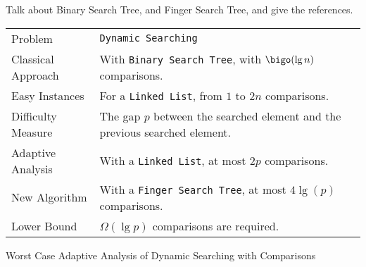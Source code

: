 \begin{TODO}
Talk about Binary Search Tree,
and Finger Search Tree, and give the references.
\end{TODO}




\begin{adaptiveanalysis}
  \begin{tabular}{@{\bf}p{}p{}}
    Problem            & {\tt Dynamic Searching}\\               
    Classical Approach & With {\tt Binary Search Tree}, with $\bigo(\lg n)$ comparisons.\\
    Easy Instances     & For a {\tt Linked List}, from $1$ to $2n$ comparisons.\\
    Difficulty Measure & The gap $p$ between the searched element and the previous searched element.\\
    Adaptive Analysis  & With a {\tt Linked List}, at most $2p$ comparisons.\\
    New Algorithm      & With a {\tt Finger Search Tree}, at most $4\lg(p)$ comparisons. \\
    Lower Bound        & $\Omega(\lg p)$ comparisons are required.\\
  \end{tabular}
  \caption{Worst Case Adaptive Analysis of Dynamic Searching with
    Comparisons}
  \label{tab:dynamicSearching}
\end{adaptiveanalysis}


